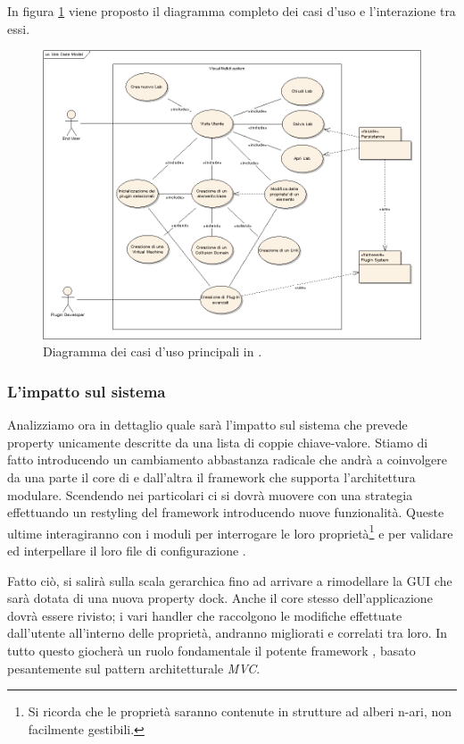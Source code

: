 In figura \ref{figura:uc1} viene proposto il diagramma completo dei casi d'uso e l'interazione tra essi.

\begin{figure}[!htb]
	\centering
	\includegraphics[width=12cm]{images/UseCaseModel.png}
	\caption{Diagramma dei casi d'uso principali in \visualnetkit{}.}
	\label{figura:uc1}
\end{figure}

\subsubsection{L'impatto sul sistema}
Analizziamo ora in dettaglio quale sarà l'impatto sul sistema che prevede property unicamente descritte da una lista di coppie chiave-valore. Stiamo di fatto introducendo un cambiamento abbastanza radicale che andrà a coinvolgere da una parte il core di \visualnetkit{} e dall'altra il framework che supporta l'architettura modulare. Scendendo nei particolari ci si dovrà muovere con una strategia \bu{} effettuando un restyling del \plugin{} framework introducendo nuove funzionalità. Queste ultime interagiranno con i moduli per interrogare le loro proprietà\footnote{Si ricorda che le proprietà saranno contenute in strutture ad alberi n-ari, non facilmente gestibili.} e per validare ed interpellare il loro file di configurazione \xml{}.

Fatto ciò, si salirà sulla scala gerarchica fino ad arrivare a rimodellare la GUI che sarà dotata di una nuova property dock. Anche il core stesso dell'applicazione dovrà essere rivisto; i vari handler che raccolgono le modifiche effettuate dall'utente all'interno delle proprietà, andranno migliorati e correlati tra loro. In tutto questo giocherà un ruolo fondamentale il potente framework \qt{}, basato pesantemente sul pattern architetturale \emph{MVC}\cite{QTDOCMVC}.

